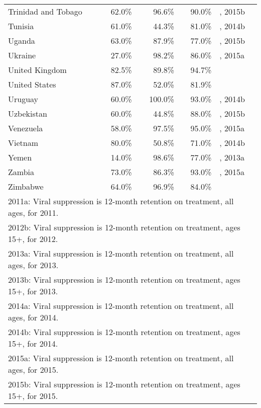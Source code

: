 \begin{longtable}{lrrrl}
  Trinidad and Tobago & 62.0\% & 96.6\% & 90.0\% & \cite{Unaids2016-an}, 2015b \\
  Tunisia & 61.0\% & 44.3\% & 81.0\% & \cite{Unaids2016-an}, 2014b \\
  Uganda & 63.0\% & 87.9\% & 77.0\% & \cite{Unaids2016-an}, 2015b \\
  Ukraine & 27.0\% & 98.2\% & 86.0\% & \cite{Unaids2016-an}, 2015a \\
  United Kingdom & 82.5\% & 89.8\% & 94.7\% & \cite{ukhIv2015} \\
  United States & 87.0\% & 52.0\% & 81.9\% & \cite{cdc2012a,cdc2014} \\
  Uruguay & 60.0\% & 100.0\% & 93.0\% & \cite{Unaids2016-an}, 2014b \\
  Uzbekistan & 60.0\% & 44.8\% & 88.0\% & \cite{Unaids2016-an}, 2015b \\
  Venezuela & 58.0\% & 97.5\% & 95.0\% & \cite{Unaids2016-an}, 2015a \\
  Vietnam & 80.0\% & 50.8\% & 71.0\% & \cite{Unaids2016-an}, 2014b \\
  Yemen & 14.0\% & 98.6\% & 77.0\% & \cite{Unaids2016-an}, 2013a \\
  Zambia & 73.0\% & 86.3\% & 93.0\% & \cite{Unaids2016-an}, 2015a \\
  Zimbabwe & 64.0\% & 96.9\% & 84.0\% & \cite{Unaids2016-an} \\
  \hline
  \multicolumn{5}{l}{2011a: Viral suppression is 12-month retention on
  treatment, all ages, for 2011.} \\
  \multicolumn{5}{l}{2012b: Viral suppression is 12-month retention on
  treatment, ages 15+, for 2012.} \\
  \multicolumn{5}{l}{2013a: Viral suppression is 12-month retention on
  treatment, all ages, for 2013.} \\
  \multicolumn{5}{l}{2013b: Viral suppression is 12-month retention on
  treatment, ages 15+, for 2013.} \\
  \multicolumn{5}{l}{2014a: Viral suppression is 12-month retention on
  treatment, all ages, for 2014.} \\
  \multicolumn{5}{l}{2014b: Viral suppression is 12-month retention on
  treatment, ages 15+, for 2014.} \\
  \multicolumn{5}{l}{2015a: Viral suppression is 12-month retention on
  treatment, all ages, for 2015.} \\
  \multicolumn{5}{l}{2015b: Viral suppression is 12-month retention on
  treatment, ages 15+, for 2015.}
\end{longtable}

